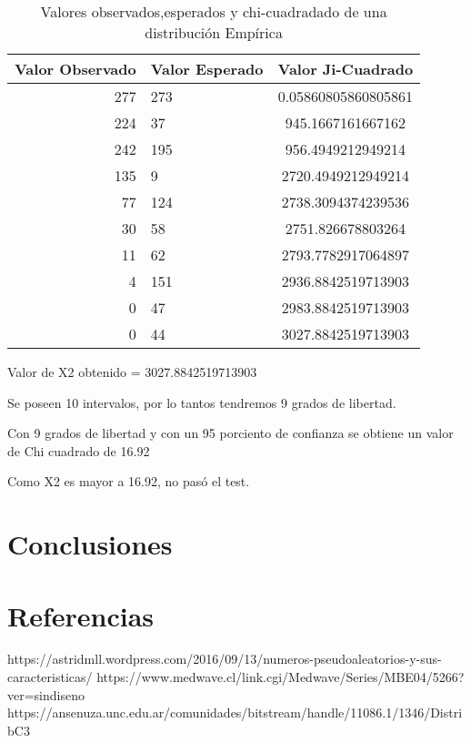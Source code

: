 \documentclass{article}
\begin{document}
\begin{table}[h]
\begin{center}
\begin{tabular}{| r | l | c |} \hline
Valor Observado & Valor Esperado &  Valor Ji-Cuadrado \\ \hline
    277& 273 & 0.05860805860805861 \\
224 & 37 & 945.1667161667162 \\
242 & 195 & 956.4949212949214 \\
135 & 9 & 2720.4949212949214 \\
77 & 124 & 2738.3094374239536 \\
30 & 58 & 2751.826678803264 \\
11 & 62 & 2793.7782917064897 \\
4 & 151 & 2936.8842519713903 \\
0 & 47 & 2983.8842519713903 \\
0 & 44 & 3027.8842519713903 \\ \hline
\end{tabular}
\caption{Valores observados,esperados y chi-cuadradado de una distribución Empírica}
\end{center}
\end{table}
Valor de X2 obtenido = 3027.8842519713903

Se poseen 10 intervalos, por lo tantos tendremos 9 grados de libertad.

Con 9 grados de libertad y con un 95 porciento de confianza se obtiene un valor de Chi cuadrado de 16.92

Como X2 es mayor a 16.92, no pasó el test.

\section{Conclusiones}


\section{Referencias}
  \label{sec:referencias}
    https://astridmll.wordpress.com/2016/09/13/numeros-pseudoaleatorios-y-sus-caracteristicas/
    https://www.medwave.cl/link.cgi/Medwave/Series/MBE04/5266?ver=sindiseno
    https://ansenuza.unc.edu.ar/comunidades/bitstream/handle/11086.1/1346/DistribC3%
\end{document}
